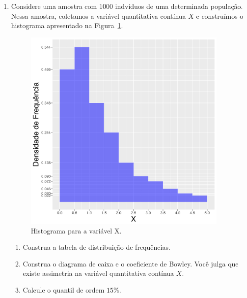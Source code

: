 \documentclass[12pt, a4paper]{article}
\begin{document}
\begin{enumerate}[1-]
	\item Considere uma amostra com 1000 indvíduos de uma determinada população. Nessa amostra, coletamos a variável quantitativa contínua $X$ e construímos o histograma apresentado na Figura~\ref{fig:X}. 
	\begin{figure}[htbp]
		\centering
		\caption{Histograma para a variável X.}
		\label{fig:X}
		\includegraphics[width=10cm]{figure/X.png}
	\end{figure}    
	\begin{enumerate}
		\item Construa a tabela de distribuição de frequências.
		\item Construa o diagrama de caixa e o coeficiente de Bowley. Você julga que existe assimetria na variável quantitativa contínua $X$.
		\item Calcule o quantil de ordem $15\%$.
	\end{enumerate}
	

\end{enumerate}
\end{document}
